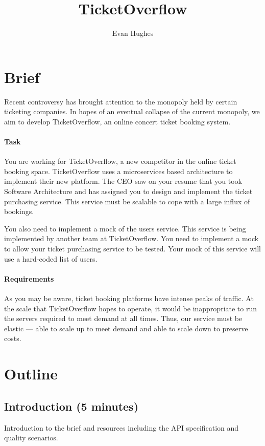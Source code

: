 \documentclass{csse4400}
\title{TicketOverflow}
\author{Evan Hughes}
\date{\week[tutorial]{10}}
\begin{document}
\maketitle


\section{Brief}

Recent controversy has brought attention to the monopoly held by certain ticketing companies.
In hopes of an eventual collapse of the current monopoly,
we aim to develop TicketOverflow,
an online concert ticket booking system.

\paragraph{Task}
You are working for TicketOverflow,
a new competitor in the online ticket booking space.
TicketOverflow uses a microservices based architecture to implement their new platform.
The CEO saw on your resume that you took Software Architecture and has assigned you to design and implement the ticket purchasing service.
This service must be scalable to cope with a large influx of bookings.

You also need to implement a mock of the users service.
This service is being implemented by another team at TicketOverflow.
You need to implement a mock to allow your ticket purchasing service to be tested.
Your mock of this service will use a hard-coded list of users.

\paragraph{Requirements}
As you may be aware,
ticket booking platforms have intense peaks of traffic.
At the scale that TicketOverflow hopes to operate,
it would be inappropriate to run the servers required to meet demand at all times.
Thus, our service must be elastic --- able to scale up to meet demand and able to scale down to preserve costs.


\section{Outline}

\subsection*{Introduction (5 minutes)}
Introduction to the brief
and resources including the API specification and quality scenarios.
\end{document}
